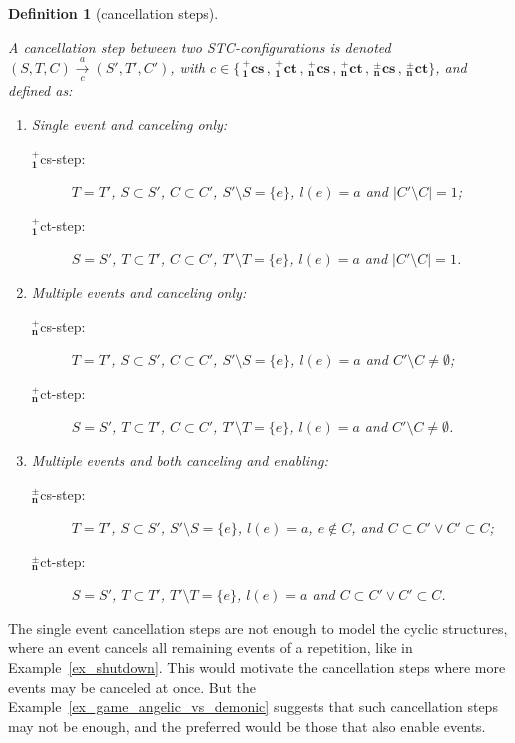 \documentclass[submission,copyright,creativecommons]{eptcs}
\newtheorem{definition}[theorem]{Definition}
\newcommand{\transitionUpDown}[2]{\ensuremath{\xrightarrow[#2]{#1}}}
\begin{document}
\begin{definition}[cancellation steps]\label{def_c_steps}\ 

A \emph{cancellation step} between two STC-configurations is denoted $(S,T,C)\transitionUpDown{a}{c}(S',T',C')$, with $c\in\{\,^{+}_{\mathbf{1}}\mathbf{cs}\,,\,^{+}_{\mathbf{1}}\mathbf{ct}\,,\,^{+}_{\mathbf{n}}\mathbf{cs}\,,\,^{+}_{\mathbf{n}}\mathbf{ct}\,,\,^{\pm}_{\mathbf{n}}\mathbf{cs}\,,\,^{\pm}_{\mathbf{n}}\mathbf{ct}\}$, and defined as:
\begin{enumerate}
\item Single event and canceling only:
\begin{description}
\item[$^{+}_{\mathbf{1}}$cs-step:] $T=T'$, $S\subset S'$, $C\subset C'$, $S'\setminus S=\{e\}$, $l(e)=a$ and $|C'\setminus C|=1$;
\item[$^{+}_{\mathbf{1}}$ct-step:] $S=S'$, $T\subset T'$, $C\subset C'$, $T'\setminus T=\{e\}$, $l(e)=a$ and $|C'\setminus C|=1$.
\end{description}

\item Multiple events and canceling only:
\begin{description}
\item[$^{+}_{\mathbf{n}}$cs-step:] $T=T'$, $S\subset S'$, $C\subset C'$, $S'\setminus S=\{e\}$, $l(e)=a$ and $C'\setminus C\neq\emptyset$;
\item[$^{+}_{\mathbf{n}}$ct-step:] $S=S'$, $T\subset T'$, $C\subset C'$, $T'\setminus T=\{e\}$, $l(e)=a$ and $C'\setminus C\neq\emptyset$.
\end{description}

\item Multiple events and both canceling and enabling:
\begin{description}
\item[$^{\pm}_{\mathbf{n}}$cs-step:] $T=T'$, $S\subset S'$, $S'\!\setminus\!S=\!\{e\}$, $l(e)=a$, $e\not\in C$, and $C\subset C' \vee C'\subset C$;
\item[$^{\pm}_{\mathbf{n}}$ct-step:] $S=S'$, $T\subset T'$, $T'\setminus T=\{e\}$, $l(e)=a$ and $C\subset C' \vee C'\subset C$.
\end{description}
\end{enumerate}
\end{definition}


The single event cancellation steps are not enough to model the cyclic structures, where an event cancels all remaining events of a repetition, like in Example~\ref{ex_shutdown}. This would motivate the cancellation steps where more events may be canceled at once. But the Example~\ref{ex_game_angelic_vs_demonic} suggests that such cancellation steps may not be enough, and the preferred would be those that also enable events.
\end{document}
